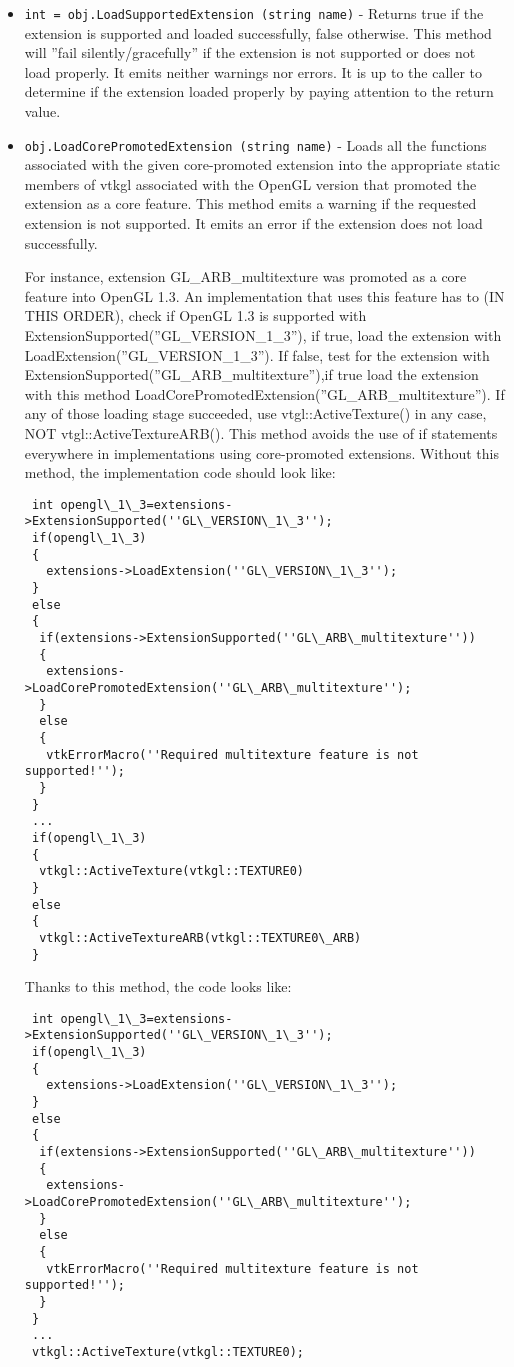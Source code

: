 \begin{itemize}
\item  \verb|int = obj.LoadSupportedExtension (string name)| -  Returns true if the extension is supported and loaded successfully,
 false otherwise. This method will ''fail silently/gracefully'' if the
 extension is not supported or does not load properly. It emits neither
 warnings nor errors. It is up to the caller to determine if the
 extension loaded properly by paying attention to the return value.

\item  \verb|obj.LoadCorePromotedExtension (string name)| -  Loads all the functions associated with the given core-promoted extension
 into the appropriate static members of vtkgl associated with the OpenGL
 version that promoted the extension as a core feature. This method emits a
 warning if the requested extension is not supported. It emits an error if
 the extension does not load successfully.

 For instance, extension GL\_ARB\_multitexture was promoted as a core
 feature into OpenGL 1.3. An implementation that uses this
 feature has to (IN THIS ORDER), check if OpenGL 1.3 is supported
 with ExtensionSupported(''GL\_VERSION\_1\_3''), if true, load the extension
 with LoadExtension(''GL\_VERSION\_1\_3''). If false, test for the extension
 with ExtensionSupported(''GL\_ARB\_multitexture''),if true load the extension
 with this method LoadCorePromotedExtension(''GL\_ARB\_multitexture'').
 If any of those loading stage succeeded, use vtgl::ActiveTexture() in
 any case, NOT vtgl::ActiveTextureARB().
 This method avoids the use of if statements everywhere in implementations
 using core-promoted extensions.
 Without this method, the implementation code should look like:
 \begin{verbatim}
 int opengl\_1\_3=extensions->ExtensionSupported(''GL\_VERSION\_1\_3'');
 if(opengl\_1\_3)
 {
   extensions->LoadExtension(''GL\_VERSION\_1\_3'');
 }
 else
 {
  if(extensions->ExtensionSupported(''GL\_ARB\_multitexture''))
  {
   extensions->LoadCorePromotedExtension(''GL\_ARB\_multitexture'');
  }
  else
  {
   vtkErrorMacro(''Required multitexture feature is not supported!'');
  }
 }
 ...
 if(opengl\_1\_3)
 {
  vtkgl::ActiveTexture(vtkgl::TEXTURE0)
 }
 else
 {
  vtkgl::ActiveTextureARB(vtkgl::TEXTURE0\_ARB)
 }
 \end{verbatim}
 Thanks to this method, the code looks like:
 \begin{verbatim}
 int opengl\_1\_3=extensions->ExtensionSupported(''GL\_VERSION\_1\_3'');
 if(opengl\_1\_3)
 {
   extensions->LoadExtension(''GL\_VERSION\_1\_3'');
 }
 else
 {
  if(extensions->ExtensionSupported(''GL\_ARB\_multitexture''))
  {
   extensions->LoadCorePromotedExtension(''GL\_ARB\_multitexture'');
  }
  else
  {
   vtkErrorMacro(''Required multitexture feature is not supported!'');
  }
 }
 ...
 vtkgl::ActiveTexture(vtkgl::TEXTURE0);
 \end{verbatim}

\end{itemize}
